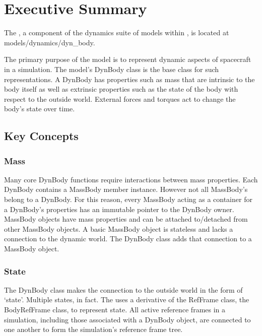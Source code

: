 %
%
%

\chapter*{Executive Summary}

The \ModelDesc, a component of the dynamics suite of models within \JEODid,
is located at models/dynamics/dyn\_body.

The primary purpose of the model is to represent dynamic aspects of
spacecraft in a simulation.
The model's DynBody class is the base class for such representations.
A DynBody has properties such as mass that are intrinsic to the body itself
as well as extrinsic properties such as the state of the body with
respect to the outside world. External forces and torques act to change
the body's state over time.

\section*{Key Concepts}

\subsection*{Mass}
Many core DynBody functions require interactions between mass properties.
Each DynBody contains a MassBody member instance. However not all MassBody's
belong to a DynBody. For this reason, every MassBody acting as a container for
a DynBody's properties has an immutable pointer to the DynBody owner.
MassBody objects have mass properties and can be attached to/detached from
other MassBody objects. A basic MassBody object is stateless and lacks a
connection to the dynamic world. The DynBody class adds that connection to a
MassBody object.

\subsection*{State}
The DynBody class makes the connection to the outside world in the form of
`state'.  Multiple states, in fact. The \ModelDesc uses a derivative of the
RefFrame class, the BodyRefFrame class, to represent state. All active
reference frames in a simulation, including those associated with a DynBody
object, are connected to one another to form the simulation's reference frame
tree.

